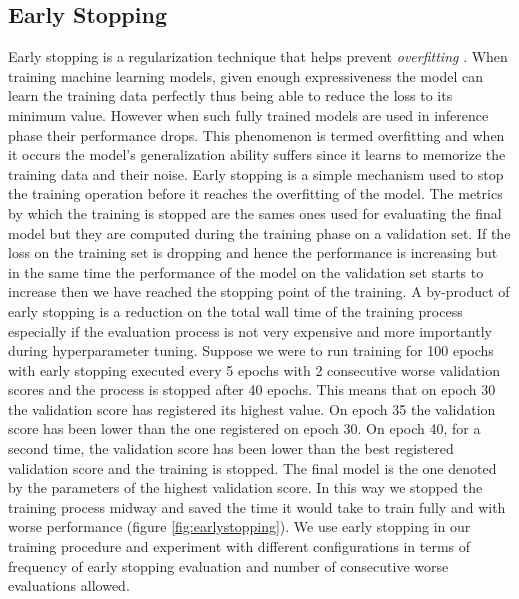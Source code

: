 \subsection{Early Stopping}
Early stopping is a regularization technique that helps prevent \emph{overfitting} \cite{yao2007early}. When training machine learning models, given enough expressiveness the model can learn the training data perfectly thus being able to reduce the loss to its minimum value. However when such fully trained models are used in inference phase their performance drops. This phenomenon is termed overfitting and when it occurs the model's generalization ability suffers since it learns to memorize the training data and their noise. Early stopping is a simple mechanism used to stop the training operation before it reaches the overfitting of the model. The metrics by which the training is stopped are the sames ones used for evaluating the final model but they are computed during the training phase on a validation set. If the loss on the training set is dropping and hence the performance is increasing but in the same time the performance of the model on the validation set starts to increase then we have reached the stopping point of the training. A by-product of early stopping is a reduction on the total wall time of the training process especially if the evaluation process is not very expensive and more importantly during hyperparameter tuning. Suppose we were to run training for 100 epochs with early stopping executed every 5 epochs with 2 consecutive worse validation scores and the process is stopped after 40 epochs. This means that on epoch 30 the validation score has registered its highest value. On epoch 35 the validation score has been lower than the one registered on epoch 30. On epoch 40, for a second time, the validation score has been lower than the best registered validation score and the training is stopped. The final model is the one denoted by the parameters of the highest validation score. In this way we stopped the training process midway and saved the time it would take to train fully and with worse performance (figure \ref{fig:earlystopping}). We use early stopping in our training procedure and experiment with different configurations in terms of frequency of early stopping evaluation and number of consecutive worse evaluations allowed.

